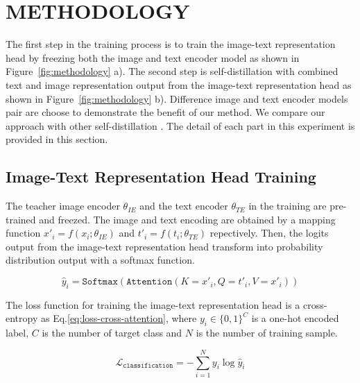 \chapter{METHODOLOGY}

The first step in the training process is to train the image-text representation head by freezing both the image and text encoder model as shown in Figure~\ref{fig:methodology} a).
The second step is self-distillation with combined text and image representation output from the image-text representation head as shown in Figure~\ref{fig:methodology} b).
Difference image and text encoder models pair are choose to demonstrate the benefit of our method.
We compare our approach with other self-distillation .
The detail of each part in this experiment is provided in this section.


\section{Image-Text Representation Head Training}

The teacher image encoder $\theta_{IE}$ and the text encoder $\theta_{TE}$ in the training are pre-trained and freezed.
The image and text encoding are obtained by a mapping function $x'_i = f(x_i; \theta_{IE})$ and $t'_i = f(t_i; \theta_{TE})$ repectively.
Then, the logits output from the image-text representation head transform into probability distribution output with a softmax function.

\begin{equation}
    \label{eq:cross-attention}
    \hat{y}_i = \texttt{Softmax}(\texttt{Attention}(K=x'_i, Q=t'_i, V=x'_i))
\end{equation}

The loss function for training the image-text representation head is a cross-entropy as Eq.\ref{eq:loss-cross-attention}, where $y_i\in\{ 0,1 \}^{C}$ is a one-hot encoded label, $C$ is the number of target class and $N$ is the number of training sample.

\begin{equation}
    \label{eq:loss-cross-attention}
    \mathcal{L}_{\texttt{classification}} = -\sum_{i=1}^{N} y_i\log\hat{y}_i
\end{equation}

